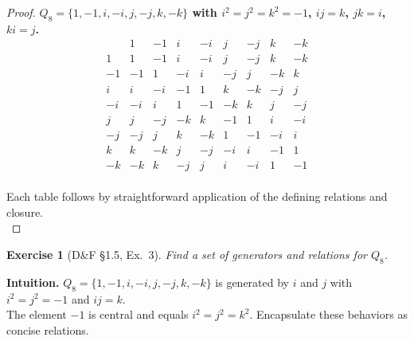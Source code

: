 \documentclass[12pt]{article}
\newtheorem{exercise}[theorem]{Exercise}
\theoremstyle{definition}
\begin{document}
\begin{proof}
\noindent\textbf{$Q_8=\{1,-1,i,-i,j,-j,k,-k\}$ with $i^2=j^2=k^2=-1$, $ij=k$, $jk=i$, $ki=j$.}\\[-0.5em]

\[
\begin{array}{c|cccccccc}
     & 1 & -1 & i & -i & j & -j & k & -k\\\hline
1    & 1 & -1 & i & -i & j & -j & k & -k\\
-1   & -1 & 1 & -i & i & -j & j & -k & k\\
i    & i & -i & -1 & 1 & k & -k & -j & j\\
-i   & -i & i & 1 & -1 & -k & k & j & -j\\
j    & j & -j & -k & k & -1 & 1 & i & -i\\
-j   & -j & j & k & -k & 1 & -1 & -i & i\\
k    & k & -k & j & -j & -i & i & -1 & 1\\
-k   & -k & k & -j & j & i & -i & 1 & -1
\end{array}
\]\\

\noindent Each table follows by straightforward application of the defining relations and closure.\\
\end{proof}

\newpage

\begin{exercise}[D\&F §1.5, Ex.~3]
Find a set of generators and relations for $Q_8$.
\end{exercise}

\dotfill

\noindent\textbf{Intuition.}
$Q_8=\{1,-1,i,-i,j,-j,k,-k\}$ is generated by $i$ and $j$ with $i^2=j^2=-1$ and $ij=k$.\\
The element $-1$ is central and equals $i^2=j^2=k^2$. Encapsulate these behaviors as concise relations.

\dotfill
\end{document}

